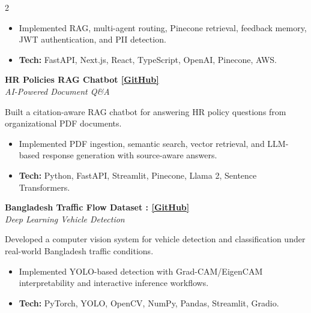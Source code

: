 \documentclass[10pt,a4paper]{article}
\newcommand{\project}[2]{
    \textbf{#1}\\
    \textit{\small #2}
}
\begin{document}
\begin{multicols}{2}
\begin{itemize}
\item Implemented RAG, multi-agent routing, Pinecone retrieval, feedback memory, JWT authentication, and PII detection.
\item \textbf{Tech:} FastAPI, Next.js, React, TypeScript, OpenAI, Pinecone, AWS.
\end{itemize}

\vspace{1.5mm}

\project
{HR Policies RAG Chatbot \href{https://github.com/Shah-Abdul-Mazid/DevelopRag.git}{[GitHub]}}
{AI-Powered Document Q\&A}

\vspace{0.5mm}

Built a citation-aware RAG chatbot for answering HR policy questions from organizational PDF documents.

\begin{itemize}
\item Implemented PDF ingestion, semantic search, vector retrieval, and LLM-based response generation with source-aware answers.
\item \textbf{Tech:} Python, FastAPI, Streamlit, Pinecone, Llama 2, Sentence Transformers.
\end{itemize}

\vspace{1.5mm}

\project
{Bangladesh Traffic Flow Dataset :
\href{YOUR_TRAFFIC_GITHUB_LINK}{[GitHub]}}

{Deep Learning Vehicle Detection}

\vspace{0.5mm}

Developed a computer vision system for vehicle detection and classification under real-world Bangladesh traffic conditions.

\begin{itemize}
\item Implemented YOLO-based detection with Grad-CAM/EigenCAM interpretability and interactive inference workflows.
\item \textbf{Tech:} PyTorch, YOLO, OpenCV, NumPy, Pandas, Streamlit, Gradio.
\end{itemize}

\vspace{1.5mm}


\end{multicols}
\end{document}
